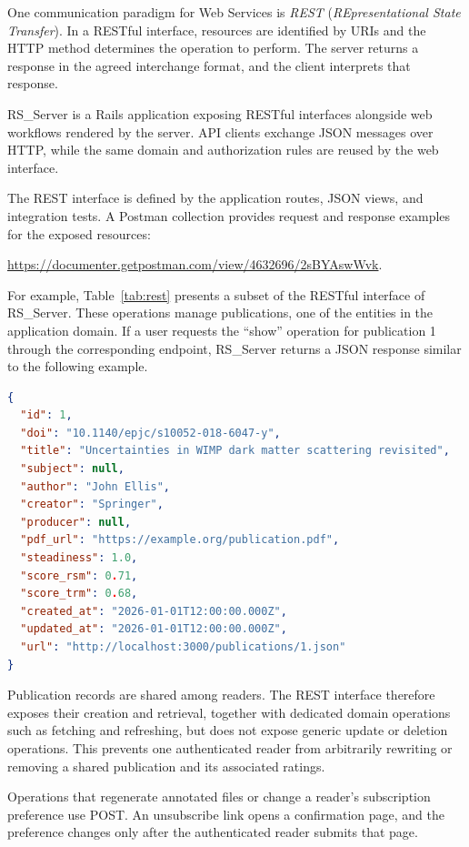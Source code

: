 \documentclass[a4paper, english]{article}
\newcommand{\rsserver}{RS\_Server\xspace}
\begin{document}
One communication paradigm for Web Services is \emph{REST} (\emph{REpresentational State Transfer}). In a RESTful interface, resources are identified by URIs and the HTTP method determines the operation to perform. The server returns a response in the agreed interchange format, and the client interprets that response.

\rsserver is a Rails application exposing RESTful interfaces alongside web workflows rendered by the server. API clients exchange JSON messages over HTTP, while the same domain and authorization rules are reused by the web interface.

The REST interface is defined by the application routes, JSON views, and integration tests. A Postman collection provides request and response examples for the exposed resources:
\begin{center}
\small\url{https://documenter.getpostman.com/view/4632696/2sBYAswWvk}.
\end{center}

For example, Table~\ref{tab:rest} presents a subset of the RESTful interface of \rsserver. These operations manage publications, one of the entities in the application domain. If a user requests the ``show'' operation for publication 1 through the corresponding endpoint, \rsserver returns a JSON response similar to the following example.

\begin{lstlisting}[language=json,firstnumber=1]
{
  "id": 1,
  "doi": "10.1140/epjc/s10052-018-6047-y",
  "title": "Uncertainties in WIMP dark matter scattering revisited",
  "subject": null,
  "author": "John Ellis",
  "creator": "Springer",
  "producer": null,
  "pdf_url": "https://example.org/publication.pdf",
  "steadiness": 1.0,
  "score_rsm": 0.71,
  "score_trm": 0.68,
  "created_at": "2026-01-01T12:00:00.000Z",
  "updated_at": "2026-01-01T12:00:00.000Z",
  "url": "http://localhost:3000/publications/1.json"
}
\end{lstlisting}

Publication records are shared among readers. The REST interface therefore exposes their creation and retrieval, together with dedicated domain operations such as fetching and refreshing, but does not expose generic update or deletion operations. This prevents one authenticated reader from arbitrarily rewriting or removing a shared publication and its associated ratings.

Operations that regenerate annotated files or change a reader's subscription preference use POST. An unsubscribe link opens a confirmation page, and the preference changes only after the authenticated reader submits that page.
\end{document}

